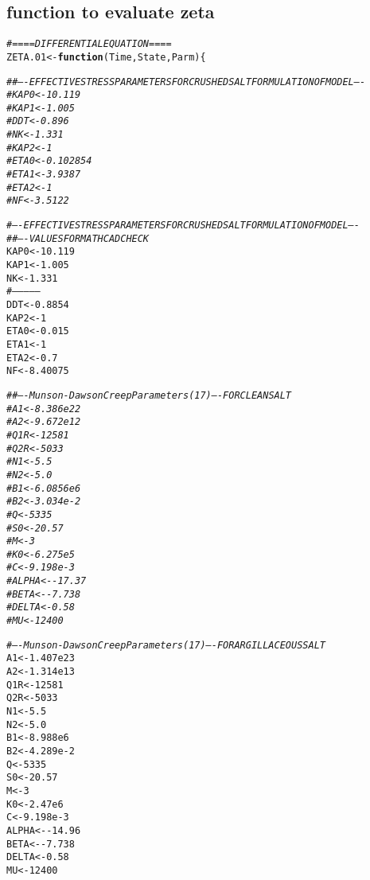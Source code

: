 \documentclass{article}\usepackage[]{graphicx}\usepackage[]{color}
\makeatletter
\newcommand{\hlnum}[1]{\textcolor[rgb]{0.686,0.059,0.569}{#1}}%
\newcommand{\hlcom}[1]{\textcolor[rgb]{0.678,0.584,0.686}{\textit{#1}}}%
\newcommand{\hlopt}[1]{\textcolor[rgb]{0,0,0}{#1}}%
\newcommand{\hlstd}[1]{\textcolor[rgb]{0.345,0.345,0.345}{#1}}%
\newcommand{\hlkwa}[1]{\textcolor[rgb]{0.161,0.373,0.58}{\textbf{#1}}}%
\newcommand{\hlkwb}[1]{\textcolor[rgb]{0.69,0.353,0.396}{#1}}%
\newcommand{\hlkwc}[1]{\textcolor[rgb]{0.333,0.667,0.333}{#1}}%
\newenvironment{kframe}{%
 \def\at@end@of@kframe{}%
 \ifinner\ifhmode%
  \def\at@end@of@kframe{\end{minipage}}%
  \begin{minipage}{\columnwidth}%
 \fi\fi%
 \def\FrameCommand##1{\hskip\@totalleftmargin \hskip-\fboxsep
 \colorbox{shadecolor}{##1}\hskip-\fboxsep
     \hskip-\linewidth \hskip-\@totalleftmargin \hskip\columnwidth}%
 \MakeFramed {\advance\hsize-\width
   \@totalleftmargin\z@ \linewidth\hsize
   \@setminipage}}%
 {\par\unskip\endMakeFramed%
 \at@end@of@kframe}
\newenvironment{knitrout}{}{} %
\makeatother
\begin{document}
\subsection{function to evaluate zeta}
\begin{knitrout}
\color{fgcolor}\begin{kframe}
\begin{alltt}
\hlcom{# ==== DIFFERENTIAL EQUATION ====}
\hlstd{ZETA.01} \hlkwb{<-} \hlkwa{function}\hlstd{(}\hlkwc{Time}\hlstd{,} \hlkwc{State}\hlstd{,} \hlkwc{Parm}\hlstd{)\{}

\hlcom{#   # ---- EFFECTIVE STRESS PARAMETERS FOR CRUSHED SALT FORMULATION OF MODEL ----}
\hlcom{#   KAP0 <- 10.119}
\hlcom{#   KAP1 <- 1.005}
\hlcom{#   DDT  <- 0.896}
\hlcom{#   NK   <- 1.331}
\hlcom{#   KAP2 <- 1}
\hlcom{#   ETA0  <- 0.102854}
\hlcom{#   ETA1  <- 3.9387}
\hlcom{#   ETA2   <- 1}
\hlcom{#   NF   	<- 3.5122}

  \hlcom{# ---- EFFECTIVE STRESS PARAMETERS FOR CRUSHED SALT FORMULATION OF MODEL ----}
\hlcom{#   # ---- VALUES FOR MATHCAD CHECK}
  \hlstd{KAP0} \hlkwb{<-} \hlnum{10.119}
  \hlstd{KAP1} \hlkwb{<-} \hlnum{1.005}
  \hlstd{NK}   \hlkwb{<-} \hlnum{1.331}
  \hlcom{#--------------}
  \hlstd{DDT}  \hlkwb{<-} \hlnum{0.8854}
  \hlstd{KAP2} \hlkwb{<-} \hlnum{1}
  \hlstd{ETA0}  \hlkwb{<-} \hlnum{0.015}
  \hlstd{ETA1}  \hlkwb{<-} \hlnum{1}
  \hlstd{ETA2}   \hlkwb{<-} \hlnum{0.7}
  \hlstd{NF}    \hlkwb{<-} \hlnum{8.40075}

\hlcom{#   # ---- Munson-Dawson Creep Parameters (17) ---- FOR CLEAN SALT}
\hlcom{#   A1   	<- 8.386e22}
\hlcom{#   A2 		<- 9.672e12}
\hlcom{#   Q1R 	<- 12581}
\hlcom{#   Q2R 	<- 5033}
\hlcom{#   N1 		<- 5.5}
\hlcom{#   N2 		<- 5.0}
\hlcom{#   B1 		<- 6.0856e6}
\hlcom{#   B2 		<- 3.034e-2}
\hlcom{#   Q 		<- 5335}
\hlcom{#   S0 		<- 20.57}
\hlcom{#   M 		<- 3}
\hlcom{#   K0 		<- 6.275e5}
\hlcom{#   C 		<- 9.198e-3}
\hlcom{#   ALPHA <- -17.37}
\hlcom{#   BETA 	<- -7.738}
\hlcom{#   DELTA <- 0.58}
\hlcom{#   MU 		<- 12400}

  \hlcom{# ---- Munson-Dawson Creep Parameters (17) ---- FOR ARGILLACEOUS SALT}
  \hlstd{A1}    \hlkwb{<-} \hlnum{1.407e23}
  \hlstd{A2}            \hlkwb{<-} \hlnum{1.314e13}
  \hlstd{Q1R}   \hlkwb{<-} \hlnum{12581}
  \hlstd{Q2R}   \hlkwb{<-} \hlnum{5033}
  \hlstd{N1}            \hlkwb{<-} \hlnum{5.5}
  \hlstd{N2}            \hlkwb{<-} \hlnum{5.0}
  \hlstd{B1}            \hlkwb{<-} \hlnum{8.988e6}
  \hlstd{B2}            \hlkwb{<-} \hlnum{4.289e-2}
  \hlstd{Q}             \hlkwb{<-} \hlnum{5335}
  \hlstd{S0}            \hlkwb{<-} \hlnum{20.57}
  \hlstd{M}             \hlkwb{<-} \hlnum{3}
  \hlstd{K0}            \hlkwb{<-} \hlnum{2.47e6}
  \hlstd{C}             \hlkwb{<-} \hlnum{9.198e-3}
  \hlstd{ALPHA} \hlkwb{<-} \hlopt{-}\hlnum{14.96}
  \hlstd{BETA}  \hlkwb{<-} \hlopt{-}\hlnum{7.738}
  \hlstd{DELTA} \hlkwb{<-} \hlnum{0.58}
  \hlstd{MU}            \hlkwb{<-} \hlnum{12400}


\end{alltt}
\end{kframe}
\end{knitrout}
\end{document}

